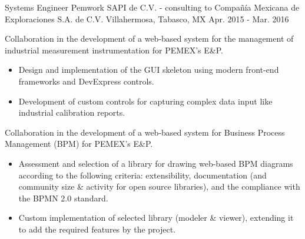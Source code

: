 \begin{cventries}

\cventry
{Systems Engineer} %
{Pemwork SAPI de C.V. - consulting to Compañía Mexicana de Exploraciones S.A. de C.V.} %
{Villahermosa, Tabasco, MX} %
{Apr. 2015 - Mar. 2016} %
{ %
	\begin{cvitems}
		\item{Collaboration in the development of a web-based system for the management of industrial measurement instrumentation for PEMEX's E\&P.}
		\begin{itemize}
			\item{Design and implementation of the GUI skeleton using modern front-end frameworks and DevExpress controls.}
			\item{Development of custom controls for capturing complex data input like industrial calibration reports.}
		\end{itemize}		
		\item{Collaboration in the development of a web-based system for Business Process Management (BPM) for PEMEX's E\&P.}
		\begin{itemize}
			\item{Assessment and selection of a library for drawing web-based BPM diagrams according to the following criteria: extensibility, documentation (and community size \& activity for open source libraries), and the compliance with the BPMN 2.0 standard.}
			\item{Custom implementation of selected library (modeler \& viewer), extending it to add the required features by the project.}
		\end{itemize}
	\end{cvitems}
}



\end{cventries}
